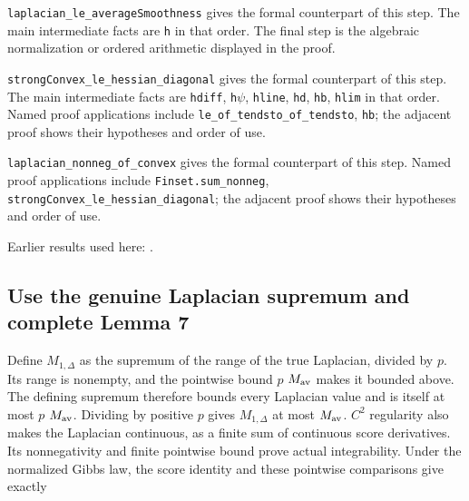 \documentclass[11pt,a4paper]{report}
\begin{document}
\begin{leanbox}
\texttt{laplacian\_\allowbreak{}le\_\allowbreak{}average\allowbreak{}Smoothness} gives the formal counterpart of this step. The main intermediate facts are \texttt{h} in that order. The final step is the algebraic normalization or ordered arithmetic displayed in the proof.




\texttt{strong\allowbreak{}Convex\_\allowbreak{}le\_\allowbreak{}hessian\_\allowbreak{}diagonal} gives the formal counterpart of this step. The main intermediate facts are \texttt{hdiff}, \texttt{h\ensuremath{\psi}}, \texttt{hline}, \texttt{hd}, \texttt{hb}, \texttt{hlim} in that order. Named proof applications include \texttt{le\_\allowbreak{}of\_\allowbreak{}tendsto\_\allowbreak{}of\_\allowbreak{}tendsto}, \texttt{hb}; the adjacent proof shows their hypotheses and order of use.




\texttt{laplacian\_\allowbreak{}nonneg\_\allowbreak{}of\_\allowbreak{}convex} gives the formal counterpart of this step. Named proof applications include \texttt{Finset.\allowbreak{}sum\_\allowbreak{}nonneg}, \texttt{strong\allowbreak{}Convex\_\allowbreak{}le\_\allowbreak{}hessian\_\allowbreak{}diagonal}; the adjacent proof shows their hypotheses and order of use.
\end{leanbox}


Earlier results used here: \cite[Section~3.2.3]{LangevinLean2026ULASC}.
\subsection{\texorpdfstring{Use the genuine Laplacian supremum and complete Lemma 7}{Use the genuine Laplacian supremum and complete Lemma 7}}
\label{report-step-AverageLMC-ScoreMoment-lean-6}


Define \(M_{1,\Delta}\) as the supremum of the range of the true Laplacian, divided by \(p\). Its range is nonempty, and the pointwise bound \(p\) \(M_{\rm av}\) makes it bounded above. The defining supremum therefore bounds every Laplacian value and is itself at most \(p\) \(M_{\rm av}\). Dividing by positive \(p\) gives \(M_{1,\Delta}\) at most \(M_{\rm av}\). \(C^{2}\) regularity also makes the Laplacian continuous, as a finite sum of continuous score derivatives. Its nonnegativity and finite pointwise bound prove actual integrability. Under the normalized Gibbs law, the score identity and these pointwise comparisons give exactly
\end{document}
